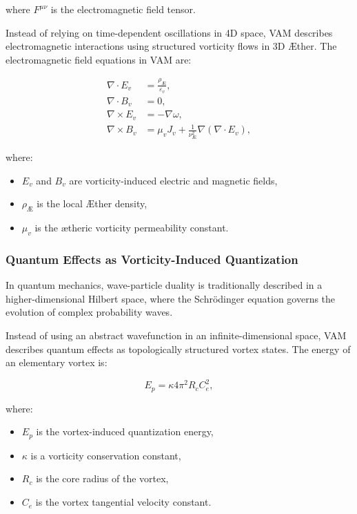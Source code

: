     where \( F^{\mu\nu} \) is the electromagnetic field tensor.

    Instead of relying on time-dependent oscillations in 4D space, VAM describes electromagnetic interactions using structured vorticity flows in 3D Æther. The electromagnetic field equations in VAM are:

    \begin{align}
        \nabla \cdot E_v &= \frac{\rho_{\text{Æ}}}{\varepsilon_v}, \\
        \nabla \cdot B_v &= 0, \\
        \nabla \times E_v &= -\nabla \omega, \\
        \nabla \times B_v &= \mu_v J_v + \frac{1}{\nu^2_{\text{Æ}}} \nabla(\nabla \cdot E_v),
    \end{align}

    where:
    \begin{itemize}
        \item \( E_v \) and \( B_v \) are vorticity-induced electric and magnetic fields,
        \item \( \rho_{\text{Æ}} \) is the local Æther density,
        \item \( \mu_v \) is the ætheric vorticity permeability constant.
    \end{itemize}

    \subsubsection*{Quantum Effects as Vorticity-Induced Quantization}

    In quantum mechanics, wave-particle duality is traditionally described in a higher-dimensional Hilbert space, where the Schrödinger equation governs the evolution of complex probability waves.

    Instead of using an abstract wavefunction in an infinite-dimensional space, VAM describes quantum effects as topologically structured vortex states. The energy of an elementary vortex is:

    \begin{equation*}
        E_p = \kappa 4\pi^2 R_c C^2_e,
    \end{equation*}

    where:
    \begin{itemize}
        \item \( E_p \) is the vortex-induced quantization energy,
        \item \( \kappa \) is a vorticity conservation constant,
        \item \( R_c \) is the core radius of the vortex,
        \item \( C_e \) is the vortex tangential velocity constant.
    \end{itemize}

